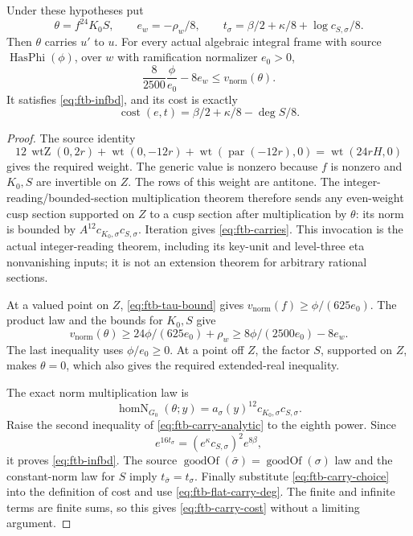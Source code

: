 \begin{srproposition}
\label{prop:ftb-carry-explicit}
Under these hypotheses put
\[
 \theta=f^{24}K_0S,\qquad
 e_w=-\rho_w/8,\qquad
 t_\sigma=\beta/2+\kappa/8+\log c_{S,\sigma}/8.
 \tag{C10}\label{eq:ftb-carry-choice}
\]
Then \(\theta\) carries \(u'\) to \(u\).  For every actual
algebraic integral frame with source
\(\operatorname{HasPhi}(\phi)\), over \(w\) with ramification
normalizer \(e_0>0\),
\[
 \frac8{2500}\frac{\phi}{e_0}-8e_w
           \leq v_{\mathrm{norm}}(\theta).          \tag{C11}\label{eq:ftb-carry-finite}
\]
It satisfies \eqref{eq:ftb-infbd}, and its cost is exactly
\[
          \operatorname{cost}(e,t)
                =\beta/2+\kappa/8-\deg S/8.         \tag{C12}\label{eq:ftb-carry-cost}
\]
\end{srproposition}
\begin{proof}
The source identity
\[
 12\,\operatorname{wtZ}(0,2r)
  +\operatorname{wt}(0,-12r)
  +\operatorname{wt}(\operatorname{par}(-12r),0)
       =\operatorname{wt}(24rH,0)
\]
gives the required weight.  The generic value is nonzero because
\(f\) is nonzero and \(K_0,S\) are invertible on \(Z\).
The rows of this weight are antitone.
The integer-reading/bounded-section multiplication theorem therefore
sends any even-weight cusp section supported on \(Z\) to a cusp
section after multiplication by \(\theta\): its norm is bounded by
\(A^{12}c_{K_0,\sigma}c_{S,\sigma}\).
Iteration gives \eqref{eq:ftb-carries}.  This invocation is the actual
integer-reading theorem, including its key-unit and level-three eta
nonvanishing inputs; it is not an extension theorem for arbitrary
rational sections.

At a valued point on \(Z\), \eqref{eq:ftb-tau-bound} gives
\(v_{\mathrm{norm}}(f)\geq\phi/(625e_0)\).
The product law and the bounds for \(K_0,S\) give
\[
 v_{\mathrm{norm}}(\theta)
     \geq24\phi/(625e_0)+\rho_w
     \geq8\phi/(2500e_0)-8e_w .
\]
The last inequality uses \(\phi/e_0\geq0\).
At a point off \(Z\), the factor \(S\), supported on \(Z\), makes
\(\theta=0\), which also gives the required extended-real inequality.

The exact norm multiplication law is
\[
 \operatorname{homN}_{G_0}(\theta;y)
       =a_\sigma(y)^{12}c_{K_0,\sigma}c_{S,\sigma}.
\]
Raise the second inequality of \eqref{eq:ftb-carry-analytic} to
the eighth power.  Since
\[
 e^{16t_\sigma}
       =(e^\kappa c_{S,\sigma})^2e^{8\beta},
\]
it proves \eqref{eq:ftb-infbd}.  The source
\(\operatorname{goodOf}(\bar\sigma)=\operatorname{goodOf}(\sigma)\)
law and the constant-norm law for \(S\) imply
\(t_{\bar\sigma}=t_\sigma\).  Finally substitute
\eqref{eq:ftb-carry-choice} into the definition of cost and use
\eqref{eq:ftb-flat-carry-deg}.  The finite and infinite terms are
finite sums, so this gives \eqref{eq:ftb-carry-cost} without a
limiting argument.
\end{proof}

